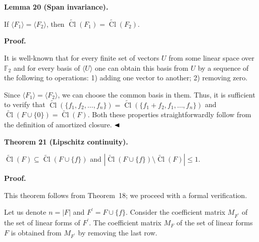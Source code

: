 \par\medskip\noindent\textbf{
Lemma 20 (Span invariance).
}\par



If $\langle F_{1}\rangle=\langle F_{2}\rangle$, then $\widetilde{\mathop{\mathrm{Cl}}}(F_{1})=\widetilde{\mathop{\mathrm{Cl}}}(F_{2})$.\par



\par\medskip\noindent\textbf{Proof.}\par


It is well-known that for every finite set of vectors $U$ from some linear space over $\mathbb{F}_{2}$ and for every basis of $\langle U\rangle$ one can obtain this basis from $U$ by a sequence of the following to operations: 1) adding one vector to another; 2) removing zero.\par



Since $\langle F_{1}\rangle=\langle F_{2}\rangle$, we can choose the common basis in them.
Thus, it is sufficient to verify that $\widetilde{\mathop{\mathrm{Cl}}}(\{f_{1},f_{2},\dots,f_{n}\})=\widetilde{\mathop{\mathrm{Cl}}}(\{f_{1}+f_{2},f_{1},\dots,f_{n}\})$ and $\widetilde{\mathop{\mathrm{Cl}}}(F\cup\{0\})=\widetilde{\mathop{\mathrm{Cl}}}(F)$. Both these properties straightforwardly follow from the definition of amortized closure.
$\hfill\blacktriangleleft$\par



\par\medskip\noindent\textbf{
Theorem 21 (Lipschitz continuity).
}\par



$\widetilde{\mathop{\mathrm{Cl}}}(F)\subseteq\widetilde{\mathop{\mathrm{Cl}}}(F\cup\{f\})$ and $|\widetilde{\mathop{\mathrm{Cl}}}(F\cup\{f\})\setminus\widetilde{\mathop{\mathrm{Cl}}}(F)|\leq 1$.\par



\par\medskip\noindent\textbf{Proof.}\par


This theorem follows from Theorem 18; we proceed with a formal verification.\par



Let us denote $n=|F|$ and $F^{\prime}=F\cup\{f\}$. Consider the coefficient matrix $M_{F^{\prime}}$ of the set of linear forms of $F^{\prime}$. The coefficient matrix $M_{F}$ of the set of linear forms $F$ is obtained from $M_{F^{\prime}}$ by removing the last row.\par



